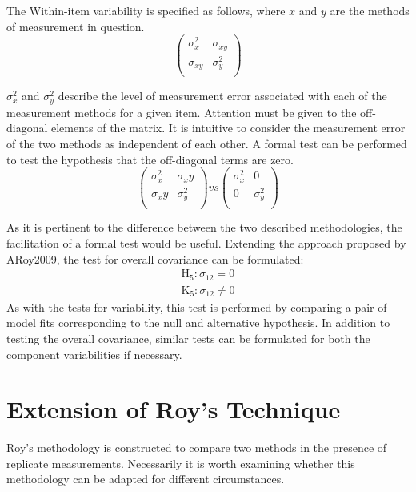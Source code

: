 \documentclass[12pt, a4paper]{report}
\theoremstyle{plain}
\theoremstyle{definition}
\theoremstyle{remark}
\begin{document}
	The Within-item variability is specified as follows, where $x$ and $y$ are the methods of measurement in question.
	\[ \left(
	\begin{array}{cc}
	\sigma^2_x & \sigma_{xy} \\
	\sigma_{xy} & \sigma^2_y \\
	\end{array}
	\right)
	\]
	
	$\sigma^2_x$ and $\sigma^2_y$ describe the level of measurement error associated with each of the measurement methods for a given item. Attention must be given to the off-diagonal elements of the matrix. It is intuitive to consider the measurement error of the two methods as independent of each other. A formal test can be performed to test the hypothesis that the off-diagonal terms are zero.
	\[ \left(
	\begin{array}{cc}
	\sigma^2_x & \sigma_xy \\
	\sigma_xy & \sigma^2_y \\
	\end{array}
	\right) vs \left(
	\begin{array}{cc}
	\sigma^2_x & 0 \\
	0 & \sigma^2_y \\
	\end{array}
	\right)
	\]
	
As it is pertinent to the difference between the two described methodologies, the facilitation of a formal test would be useful. Extending the approach proposed by ARoy2009, the test for overall covariance can be formulated:
	\begin{eqnarray*}
		\operatorname{H_5} : \sigma_{12} = 0 \\
		\operatorname{K_5} : \sigma_{12} \neq 0
	\end{eqnarray*}
As with the tests for variability, this test is performed by comparing a pair of model fits corresponding to the null and alternative hypothesis. In addition to testing the overall covariance, similar tests can be formulated for both the component variabilities if necessary.
	
\section{Extension of Roy's Technique}
Roy's methodology is constructed to compare two methods in the presence of replicate measurements. Necessarily it is worth examining whether this methodology can be adapted for different circumstances.
		
\end{document}
